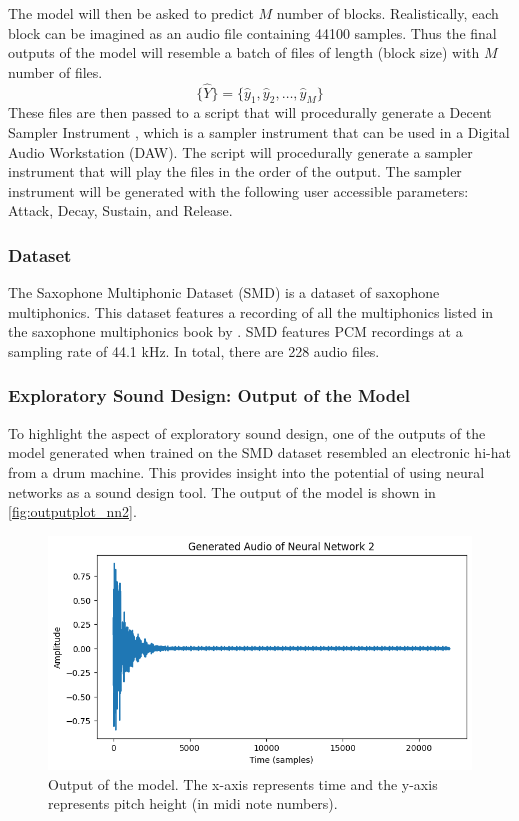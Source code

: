 \documentclass{article}
\begin{document}
The model will then be asked to predict $M$ number of blocks. Realistically, each block can be imagined as an audio file containing 44100 samples. Thus the final outputs of the model will resemble a batch of files of length (block size) with $M$ number of files.
\begin{equation}
	\{ \hat{Y} \} = \{ \hat{y}_1, \hat{y}_2, \dots, \hat{y}_M \}
\end{equation}
These files are then passed to a script that will procedurally generate a Decent Sampler Instrument \citep{Shopdece2:online}, which is a sampler instrument that can be used in a Digital Audio Workstation (DAW). The script will procedurally generate a sampler instrument that will play the files in the order of the output. The sampler instrument will be generated with the following user accessible parameters: Attack, Decay, Sustain, and Release.
\subsubsection{Dataset}
The Saxophone Multiphonic Dataset (SMD) is a dataset of saxophone multiphonics. This dataset features a recording of all the multiphonics listed in the saxophone multiphonics book by \citet{kientzy1982sons}. SMD features PCM recordings at a sampling rate of 44.1 kHz. In total, there are 228 audio files.
\subsubsection{Exploratory Sound Design: Output of the Model}
To highlight the aspect of exploratory sound design, one of the outputs of the model generated when trained on the SMD dataset resembled an electronic hi-hat from a drum machine. This provides insight into the potential of using neural networks as a sound design tool. The output of the model is shown in \autoref{fig:outputplot_nn2}.

\begin{figure}[h]
	\centering
	\includegraphics[width=0.6\columnwidth]{images/outputplot_nn2.png}
	\caption{Output of the model. The x-axis represents time and the y-axis represents pitch height (in midi note numbers).}
	\label{fig:outputplot_nn2}
\end{figure}
\end{document}

